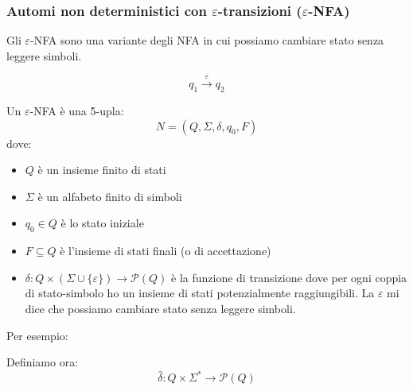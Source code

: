 \documentclass[a4paper]{article}
\begin{document}
\subsubsection{Automi non deterministici con $\varepsilon$-transizioni ($\varepsilon$-NFA)}

Gli $\varepsilon$-NFA sono una variante degli NFA in cui possiamo cambiare stato 
senza leggere simboli.

\[q_1 \stackrel{\varepsilon}{\rightarrow} q_2 \]

\dfn{}
{
    Un $\varepsilon$-NFA è una 5-upla:
    \[N = (Q, \Sigma, \delta, q_0, F)\]
    dove:
    \begin{itemize}
        \item $Q$ è un insieme finito di stati
        \item $\Sigma$ è un alfabeto finito di simboli
        \item $q_0 \in Q$ è lo stato iniziale
        \item $F \subseteq Q$ è l'insieme di stati finali (o di accettazione)
        \item $\delta : Q \times (\Sigma \cup \{\varepsilon\}) \rightarrow \mathcal{P}(Q)$ è la funzione di transizione dove 
        per ogni coppia di stato-simbolo ho un insieme di stati potenzialmente raggiungibili.
        La $\varepsilon$ mi dice che possiamo cambiare stato senza leggere simboli.
    \end{itemize}
}
\noindent
Per esempio:
\begin{figure}[H]
  \centering
\end{figure}  
\noindent 
Definiamo ora:
\[\hat{\delta}: Q \times \Sigma^* \rightarrow \mathcal{P}(Q)\]
\end{document}
